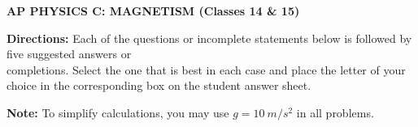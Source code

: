 \documentclass[11pt]{article}
\begin{document}
\pagestyle{fancy}
\chead{}
\lfoot{}\cfoot{-\textsf{\textbf{\thepage}}-}

\begin{center}
  \vspace{-.35in}
  {\large
    \textbf{AP PHYSICS C: MAGNETISM (Classes 14 \& 15)}
  }
\end{center}

\textbf{Directions:} Each of the questions or incomplete statements below is
followed by five suggested answers or\\
completions. Select the one that is best
in each case and place the letter of your choice in the corresponding box on
the student answer sheet.

\vspace{10pt}\textbf{Note:} To simplify calculations, you may use
$g=\SI{10}{m/s^2}$ in all problems.
\end{document}
